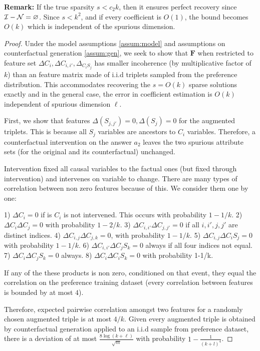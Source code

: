 \textbf{Remark:} If the true sparsity $s < c_2 k$, then it ensures perfect recovery since ${\cal I}- {\cal N} = \emptyset$. Since $s < k^2$, and if every coefficient is $O(1)$, the bound becomes $O(k)$ which is independent of the spurious dimension.
 \begin{proof} 
  Under the model assumptions \ref{assum:model} and assumptions on counterfactual generation \ref{assum:gen}, we seek to show that $\mathbf{F}$ when restricted to feature set $\Delta C_i, \Delta C_{i,i'}, \Delta_{C_iS_j}$  has smaller incoherence (by multiplicative factor of $k$) than an feature matrix made of i.i.d triplets sampled  from the preference distribution. This accommodates recovering the $s=O(k)$ sparse solutions exactly and in the general case, the error in coefficient estimation is $O(k)$ independent of spurious dimension $\ell$. 

  First, we show that features $\Delta(S_{j,j'})=0, \Delta(S_j)=0$ for the augmented triplets. This is because all $S_j$ variables are ancestors to $C_i$ variables. Therefore, a counterfactual intervention on the answer $a_2$ leaves the two spurious attribute sets (for the original and its counterfactual) unchanged. 

  Intervention fixed all causal variables to the factual ones (but fixed through intervention) and intervenes on variable to change. There are many types of correlation between non zero features because of this. We consider them one by one:

  1) $\Delta C_i =0$ if is $C_i$ is not intervened. This occurs with probability $1-1/k$. 
  2) $\Delta C_i \Delta C_j = 0$ with probability $1-2/k$.
  3) $\Delta C_{i,i'} \Delta C_{j,j'} = 0$ if all $i,i',j,j'$ are distinct indices. 
  4) $\Delta C_{i,j} \Delta C_{j,k} = 0$, with probability $1-1/k$. 
  5) $\Delta C_{i,j} \Delta C_iS_j = 0 $ with probability $1-1/k$.
  6) $\Delta C_{i,i'} \Delta C_jS_k = 0 $ always if all four indices not equal.
  7) $\Delta C_{i} \Delta C_jS_k = 0 $ always. 
  8) $\Delta C_i \Delta C_i S_k  = 0$ with probability 1-1/k. 

If any of the these products is non zero, conditioned on that event, they equal the correlation on the preference training dataset (every correlation between features is bounded by at most $4$).

Therefore, expected pairwise correlation amongst two features for a randomly chosen augmented triple is at most $4/k$. Given every augmented triple is obtained by counterfactual generation applied to an i.i.d sample from preference dataset, there is a deviation of at most $\frac{8 \log (k+ \ell)}{ \sqrt{m}}$ with probability $1- \frac{1}{(k+l)^4}$.


\end{proof}

